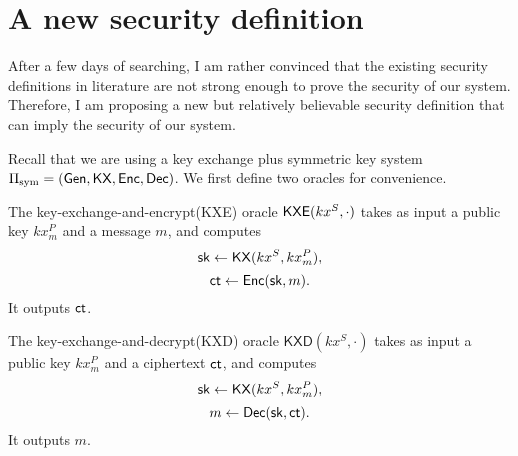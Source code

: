 \clearpage
\newcommand{\KXD}{\mathsf{KXD}}
\newcommand{\Hyb}{\mathsf{Hyb}}
\section{A new security definition}
After a few days of searching, I am rather convinced that the existing security definitions in literature are not strong enough to prove the security of our system. Therefore, I am proposing a new but relatively believable security definition that can imply the security of our system.

Recall that we are using a key exchange plus symmetric key system $\Pi_{\text{sym}} = (\mathsf{Gen}, \mathsf{KX}, \mathsf{Enc}, \mathsf{Dec})$. We first define two oracles for convenience.
\begin{definition}
\label{defn:CCPKA}
The key-exchange-and-encrypt(KXE) oracle $\mathsf{KXE}(kx^S, \cdot)$ takes as input a public key $kx_m^P$ and a message $m$, and computes
$${\mathsf{sk}} \leftarrow \mathsf{KX}(kx^S, kx_m^P),$$
$$\mathsf{ct} \leftarrow \mathsf{Enc}({\mathsf{sk}}, m).$$
It outputs $\mathsf{ct}$.

The key-exchange-and-decrypt(KXD) oracle $\KXD(kx^S, \cdot)$ takes as input a public key $kx_m^P$ and a ciphertext $\mathsf{ct}$, and computes
$${\mathsf{sk}} \leftarrow \mathsf{KX}(kx^S, kx_m^P),$$
$$m \leftarrow \mathsf{Dec}({\mathsf{sk}}, \mathsf{ct}).$$
It outputs $m$.
\end{definition}

